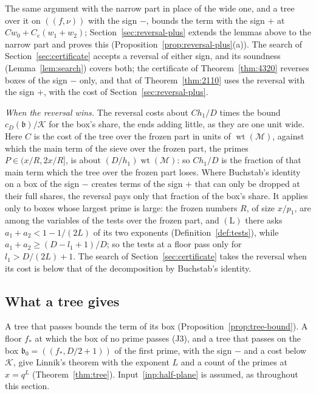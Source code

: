 \documentclass[11pt]{article}
\theoremstyle{definition}
\begin{document}
The same argument with the narrow part in place of the wide one, and a tree over it on $((f, \nu))$ with the sign $-$,
bounds the term with the sign $+$ at $Cw_0 + C_e(w_1 + w_2)$; Section~\ref{sec:reversal-plus} extends the lemmas above
to the narrow part and proves this (Proposition~\ref{prop:reversal-plus}(a)). The search of
Section~\ref{sec:certificate} accepts a reversal of either sign, and its soundness (Lemma~\ref{lem:search}) covers
both; the certificate of Theorem~\ref{thm:4320} reverses boxes of the sign $-$ only, and that of
Theorem~\ref{thm:2110} uses the reversal with the sign $+$, with the cost of Section~\ref{sec:reversal-plus}.

\emph{When the reversal wins.} The reversal costs about $C h_1/D$ times the bound $c_D(\mathfrak b)/\mathcal K$ for
the box's share,
the ends adding little, as they are one unit wide. Here $C$ is the cost of the tree over the frozen part in units of
$\operatorname{wt}(\mathcal M)$, against which the main term of the sieve over the frozen part, the primes $P \in (x/R,
2x/R]$, is about $(D/h_1)\operatorname{wt}(\mathcal M)$: so $Ch_1/D$ is the fraction of that main term which the tree
over the frozen part loses. Where Buchstab's identity on a box of the sign $-$ creates terms of the sign $+$ that can
only
be dropped at their full shares, the reversal pays only that fraction of the box's share. It applies only to boxes whose
largest prime is large: the frozen numbers $R$, of size $x/p_1$, are among the variables of the tests over the frozen
part, and $(\mathrm L)$ there asks $a_1 + a_2 < 1 - 1/(2L)$ of its two exponents (Definition~\ref{def:tests}), while
$a_1 + a_2 \ge (D - l_1 + 1)/D$; so the tests at a
floor
pass only for $l_1 > D/(2L) + 1$. The search of Section~\ref{sec:certificate} takes the reversal when its cost is below
that of the decomposition by Buchstab's identity.

\subsection{What a tree gives}

A tree that passes bounds the term of its box (Proposition~\ref{prop:tree-bound}). A floor $f_*$ at which the box of
no prime passes (J3), and a tree that passes on the box $\mathfrak b_0 = ((f_*, D/2 + 1))$ of the first prime, with
the sign $-$ and a cost below $\mathcal K$, give Linnik's theorem with the exponent $L$ and a count of the primes at
$x = q^L$ (Theorem~\ref{thm:tree}). Input~\ref{inp:half-plane} is assumed, as throughout this section.
\end{document}

